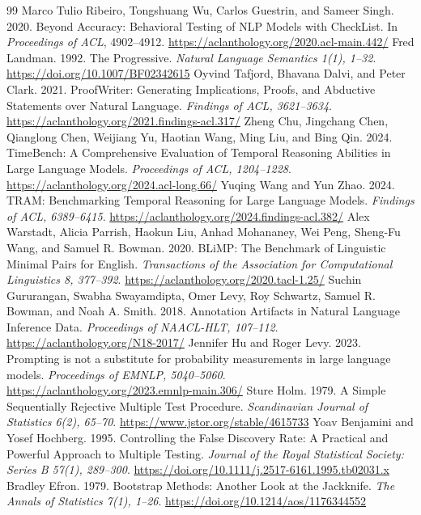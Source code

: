 \documentclass[sigconf,anonymous,review]{acmart}
\begin{document}
\begin{thebibliography}{99}
 Marco Tulio Ribeiro, Tongshuang Wu, Carlos Guestrin, and Sameer Singh. 2020. Beyond Accuracy: Behavioral Testing of NLP Models with CheckList. In \emph{Proceedings of ACL}, 4902--4912. \url{https://aclanthology.org/2020.acl-main.442/}
 Fred Landman. 1992. The Progressive. \emph{Natural Language Semantics 1(1), 1--32}. \url{https://doi.org/10.1007/BF02342615}
 Oyvind Tafjord, Bhavana Dalvi, and Peter Clark. 2021. ProofWriter: Generating Implications, Proofs, and Abductive Statements over Natural Language. \emph{Findings of ACL, 3621--3634}. \url{https://aclanthology.org/2021.findings-acl.317/}
 Zheng Chu, Jingchang Chen, Qianglong Chen, Weijiang Yu, Haotian Wang, Ming Liu, and Bing Qin. 2024. TimeBench: A Comprehensive Evaluation of Temporal Reasoning Abilities in Large Language Models. \emph{Proceedings of ACL, 1204--1228}. \url{https://aclanthology.org/2024.acl-long.66/}
 Yuqing Wang and Yun Zhao. 2024. TRAM: Benchmarking Temporal Reasoning for Large Language Models. \emph{Findings of ACL, 6389--6415}. \url{https://aclanthology.org/2024.findings-acl.382/}
 Alex Warstadt, Alicia Parrish, Haokun Liu, Anhad Mohananey, Wei Peng, Sheng-Fu Wang, and Samuel R. Bowman. 2020. BLiMP: The Benchmark of Linguistic Minimal Pairs for English. \emph{Transactions of the Association for Computational Linguistics 8, 377--392}. \url{https://aclanthology.org/2020.tacl-1.25/}
 Suchin Gururangan, Swabha Swayamdipta, Omer Levy, Roy Schwartz, Samuel R. Bowman, and Noah A. Smith. 2018. Annotation Artifacts in Natural Language Inference Data. \emph{Proceedings of NAACL-HLT, 107--112}. \url{https://aclanthology.org/N18-2017/}
 Jennifer Hu and Roger Levy. 2023. Prompting is not a substitute for probability measurements in large language models. \emph{Proceedings of EMNLP, 5040--5060}. \url{https://aclanthology.org/2023.emnlp-main.306/}
 Sture Holm. 1979. A Simple Sequentially Rejective Multiple Test Procedure. \emph{Scandinavian Journal of Statistics 6(2), 65--70}. \url{https://www.jstor.org/stable/4615733}
 Yoav Benjamini and Yosef Hochberg. 1995. Controlling the False Discovery Rate: A Practical and Powerful Approach to Multiple Testing. \emph{Journal of the Royal Statistical Society: Series B 57(1), 289--300}. \url{https://doi.org/10.1111/j.2517-6161.1995.tb02031.x}
 Bradley Efron. 1979. Bootstrap Methods: Another Look at the Jackknife. \emph{The Annals of Statistics 7(1), 1--26}. \url{https://doi.org/10.1214/aos/1176344552}

\end{thebibliography}
\end{document}
